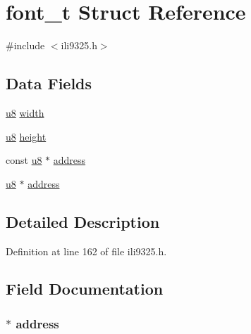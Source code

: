 \hypertarget{structfont__t}{\section{font\-\_\-t Struct Reference}
\label{structfont__t}
}


{\ttfamily \#include $<$ili9325.\-h$>$}

\subsection*{Data Fields}
\begin{DoxyCompactItemize}
\item 
\hyperlink{p8_2pinguino_2core_2typedef_8h_aed742c436da53c1080638ce6ef7d13de}{u8} \hyperlink{structfont__t_a2c1d87ba049f447519d1a92e6550f822}{width}
\item 
\hyperlink{p8_2pinguino_2core_2typedef_8h_aed742c436da53c1080638ce6ef7d13de}{u8} \hyperlink{structfont__t_ac3f221619d1bd1d6f1d46727f0c913a2}{height}
\item 
const \hyperlink{p8_2pinguino_2core_2typedef_8h_aed742c436da53c1080638ce6ef7d13de}{u8} $\ast$ \hyperlink{structfont__t_ac601b72531c4bc309bb1d926491e4988}{address}
\item 
\hyperlink{p8_2pinguino_2core_2typedef_8h_aed742c436da53c1080638ce6ef7d13de}{u8} $\ast$ \hyperlink{structfont__t_ac47f6a628bf55f0df74235026f197f72}{address}
\end{DoxyCompactItemize}


\subsection{Detailed Description}


Definition at line 162 of file ili9325.\-h.



\subsection{Field Documentation}
\hypertarget{structfont__t_ac47f6a628bf55f0df74235026f197f72}{
\subsubsection[{address}]{$\ast$ address}}\label{structfont__t_ac47f6a628bf55f0df74235026f197f72}


